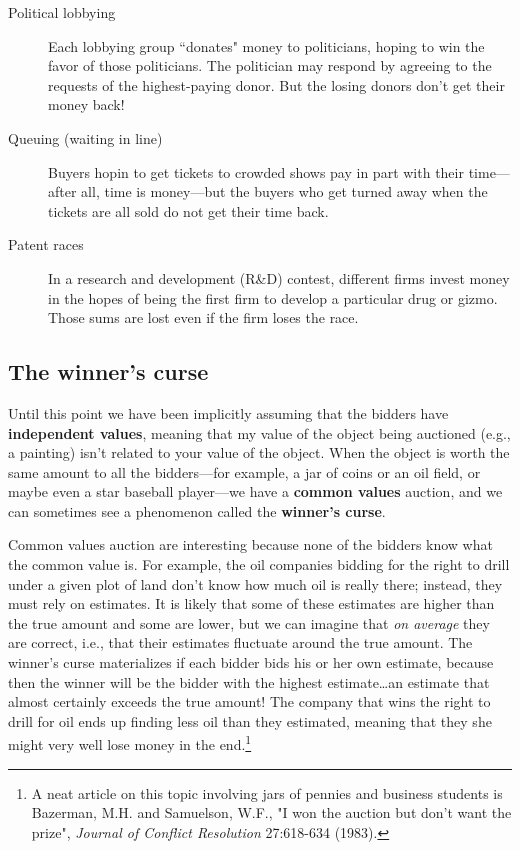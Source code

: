 \begin{description}

\item [Political lobbying] Each lobbying group ``donates" money to politicians, hoping to win the favor of those politicians. The politician may respond by agreeing to the requests of the highest-paying donor. But the losing donors don't get their money back!

\item [Queuing (waiting in line)] Buyers hopin to get tickets to crowded shows pay in part with their time---after all, time is money---but the buyers who get turned away when the tickets are all sold do not get their time back.

\item [Patent races] In a research and development (R\&D) contest, different firms invest money in the hopes of being the first firm to develop a particular drug or gizmo. Those sums are lost even if the firm loses the race.

\end{description}


\subsection*{The winner's curse}

Until this point we have been implicitly assuming that the bidders have \textbf{independent values}, meaning that my value of the object being auctioned (e.g., a painting) isn't related to your value of the object. When the object is worth the same amount to all the bidders---for example, a jar of coins  or an oil field, or maybe even a star baseball player---we have a \textbf{common values} auction, and we can sometimes see a phenomenon called the \textbf{winner's curse}.

Common values auction are interesting because none of the bidders know what the common value is. For example, the oil companies bidding for the right to drill under a given plot of land don't know how much oil is really there; instead, they must rely on estimates. It is likely that some of these estimates are higher than the true amount and some are lower, but we can imagine that \emph{on average} they are correct, i.e., that their estimates fluctuate around the true amount. The winner's curse materializes if each bidder bids his or her own estimate, because then the winner will be the bidder with the highest estimate\ldots an estimate that almost certainly exceeds the true amount! The company that wins the right to drill for oil ends up finding less oil than they estimated, meaning that they she might very well lose money in the end.\footnote{A neat article on this topic involving jars of pennies and business students is Bazerman, M.H. and Samuelson, W.F., "I won the auction but don't want the prize", \emph{Journal of Conflict Resolution} 27:618-634 (1983).}

